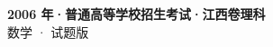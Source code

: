 \documentclass[zihao=-4, a4paper]{ctexart}
\begin{document}
\begin{center}
  {\Large\bfseries 2006 年·普通高等学校招生考试·江西卷理科}\\[4pt]
  {\large 数学 · 试题版}
\end{center}
\medskip
{}

\end{document}
